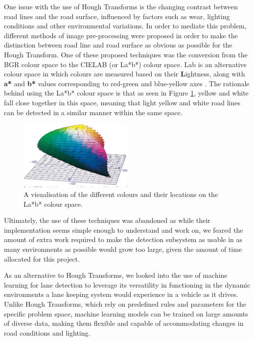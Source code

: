\documentclass[titlepage,draft]{article}
\begin{document}
One issue with the use of Hough Transforms is the changing contrast between road lines and the road surface, influenced by
factors such as wear, lighting conditions and other environmental variations.
In order to mediate this problem, different methods of image pre-processing were proposed in order to make the distinction
between road line and road surface as obvious as possible for the Hough Transform.
One of these proposed techniques was the conversion from the BGR colour space to the CIELAB (or La*b*) colour space.
La\*b\* is an alternative colour space in which colours are measured based on their \textbf{L}ightness, along with \textbf{a*} and
\textbf{b*} values corresponding to red-green and blue-yellow axes \cite{Mclaren2008}.
The rationale behind using the La*b* colour space is that as seen in Figure \ref{LabColourSpace}, yellow and white fall close
together in this space, meaning that light yellow and white road lines can be detected in a similar manner within the same space.

\begin{figure}
	\centering
	\includegraphics[width=0.5\textwidth]{Lab-colour-space}
	\caption{A visualisation of the different colours and their locations on the La*b* colour space.}
	\label{LabColourSpace}
\end{figure}

Ultimately, the use of these techniques was abandoned as while their implementation seems simple enough to understand and work
on, we feared the amount of extra work required to make the detection subsystem as usable in as many environments as possible
would grow too large, given the amount of time allocated for this project.

As an alternative to Hough Transforms, we looked into the use of machine learning for lane detection to leverage its versatility
in functioning in the dynamic environments a lane keeping system would experience in a vehicle as it drives.
Unlike Hough Transforms, which rely on predefined rules and parameters for the specific problem space, machine learning models
can be trained on large amounts of diverse data, making them flexible and capable of accommodating changes in road conditions
and lighting.
\end{document}
